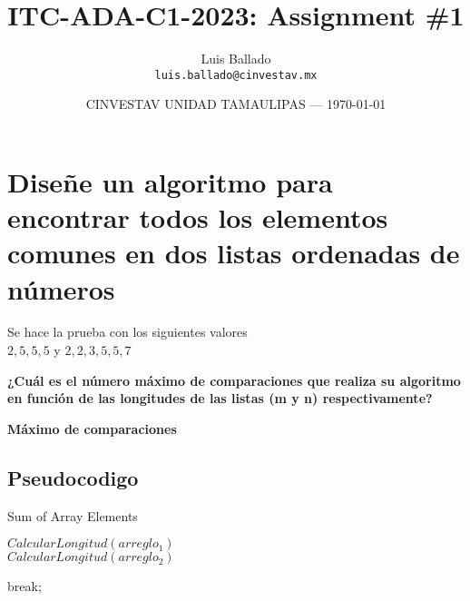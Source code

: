 \documentclass{article}
\title{ITC-ADA-C1-2023: Assignment \#1} %
\author{Luis Ballado\\ \texttt{luis.ballado@cinvestav.mx}} %
\date{CINVESTAV UNIDAD TAMAULIPAS --- \today} %
\begin{document}
\maketitle %


\section{Diseñe un algoritmo para encontrar todos los elementos comunes en dos listas ordenadas de números}

\begin{info} %
  Se hace la prueba con los siguientes valores\\
  $2,5,5,5$ y $2,2,3,5,5,7$
\end{info}

\begin{question}
  \textbf{¿Cuál es el número máximo de comparaciones que realiza su algoritmo en función de las longitudes de las listas (m y n) respectivamente?}

  \textbf{Máximo de comparaciones}
    
\end{question}


\subsection{Pseudocodigo}

\begin{center}
  \begin{minipage}{0.7\linewidth} %
    \begin{algorithm}[H] 
      \DontPrintSemicolon
      
      \caption{Sum of Array Elements}
      \label{alg:loop}
            {$CalcularLongitud(arreglo_{1})$}\\
            {$CalcularLongitud(arreglo_{2})$}

             {
               {
                break;\;
              }
            }
    \end{algorithm}
  \end{minipage}
\end{center}
\end{document}
